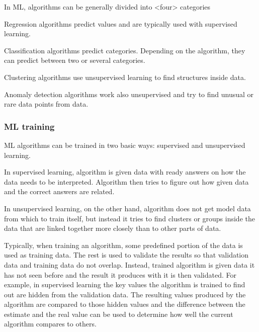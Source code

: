 In ML, 
algorithms can be generally divided into <four> categories

Regression algorithms predict values
and are typically used with supervised learning.

Classification algorithms predict categories.
Depending on the algorithm,
they can predict between two or several categories.

Clustering algorithms use unsupervised learning
to find structures inside data.

Anomaly detection algorithms work also unsupervised
and try to find unusual or rare data points from data.




\subsubsection*{ML training}
ML algorithms can be trained in two basic ways:
supervised and unsupervised learning.

In supervised learning,
algorithm is given data with ready answers on
how the data needs to be interpreted.
Algorithm then tries to figure out
how given data and the correct answers are related.

In unsupervised learning,
on the other hand,
algorithm does not get model data from which to train itself,
but instead it tries to find clusters or groups inside the data
that are linked together more closely than to other parts of data.

Typically,
when training an algorithm,
some predefined portion of the data
is used as training data.
The rest is used to validate the results
so that validation data and training data do not overlap.
Instead, trained algorithm is given data it has not seen before
and the result it produces with it is then validated.
For example,
in supervised learning
the key values the algorithm is trained to find out
are hidden from the validation data.
The resulting values produced by the algorithm
are compared to those hidden values
and the difference between the estimate and the real value
can be used to determine how well the current algorithm compares to others.

